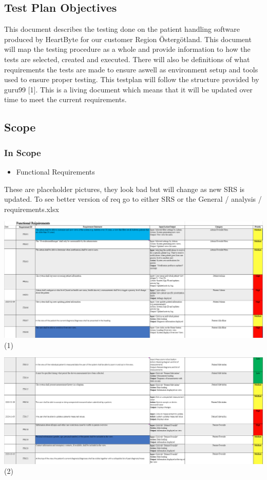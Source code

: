 
\subsection{Test Plan Objectives}
This document describes the testing done on the patient handling software produced by HeartByte for our customer Region Östergötland. This document will map the testing procedure as a whole and provide information to how the tests are selected, created and executed. There will also be definitions of what requirements the tests are made to ensure aswell as environment setup and tools used to ensure proper testing. This testplan will follow the structure provided by guru99 [1]. This is a living document which means that it will be updated over time to meet the current requirements.

\subsection{Scope}
\subsubsection{In Scope}

\begin{itemize}
  \item Functional Requirements
\end{itemize}
  These are placeholder pictures, they look bad but will change as new SRS is updated. To see better version of req go to either SRS or the General / analysis / requirements.xlsx

  \vfill
\includegraphics[width=\linewidth]{Pictures/Func1} (1)

    \vfill
    \vfill
\includegraphics[width=\linewidth]{Pictures/Func2} (2)

